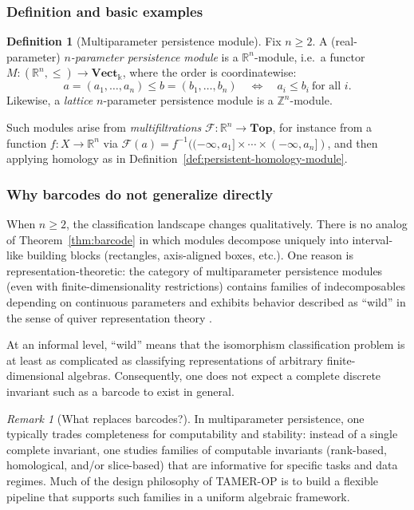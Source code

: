 \documentclass{article}
\newcommand{\kk}{\Bbbk}
\newcommand{\<}{\langle}
\renewcommand{\>}{\rangle}
\newcommand{\bbb}[1]{\ensuremath{\mathbb{#1}}}
\theoremstyle{definition}
\newtheorem{defn}[theorem]{Definition}
\theoremstyle{remark}
\newtheorem*{remark}{Remark}
\begin{document}
	\subsubsection*{Definition and basic examples}
	
	\begin{defn}[Multiparameter persistence module]\label{def:multi-parameter-module}
		Fix $n\geq 2$.  A (real-parameter) \emph{$n$-parameter persistence module} is a
		$\bbb{R}^n$-module, i.e.\ a functor $M\colon (\bbb{R}^n,\leq)\to\mathbf{Vect}_{\kk}$,
		where the order is coordinatewise:
		\[
		a=(a_1,\dots,a_n)\leq b=(b_1,\dots,b_n)\quad\Longleftrightarrow\quad
		a_i\leq b_i\ \text{for all }i.
		\]
		Likewise, a \emph{lattice} $n$-parameter persistence module is a $\bbb{Z}^n$-module.
	\end{defn}
	
	Such modules arise from \emph{multifiltrations} $\mathcal{F}\colon \bbb{R}^n\to
	\mathbf{Top}$, for instance from a function $f\colon X\to \bbb{R}^n$ via
	$\mathcal{F}(a)=f^{-1}((-\infty,a_1]\times\cdots\times(-\infty,a_n])$, and then
	applying homology as in Definition~\ref{def:persistent-homology-module}.
	
	\subsubsection*{Why barcodes do not generalize directly}
	
	When $n\geq 2$, the classification landscape changes qualitatively.  There is no
	analog of Theorem~\ref{thm:barcode} in which modules decompose uniquely into
	interval-like building blocks (rectangles, axis-aligned boxes, etc.).  One reason is
	representation-theoretic: the category of multiparameter persistence modules (even
	with finite-dimensionality restrictions) contains families of indecomposables
	depending on continuous parameters and exhibits behavior described as ``wild'' in
	the sense of quiver representation theory \cite{CZ09,Oud15}.
	
	At an informal level, ``wild'' means that the isomorphism classification problem is
	at least as complicated as classifying representations of arbitrary finite-dimensional
	algebras.  Consequently, one does not expect a complete discrete invariant such as a
	barcode to exist in general.
	
	\begin{remark}[What replaces barcodes?]\label{rmk:what-replaces-barcodes}
		In multiparameter persistence, one typically trades completeness for computability and
		stability: instead of a single complete invariant, one studies families of computable
		invariants (rank-based, homological, and/or slice-based) that are informative for
		specific tasks and data regimes.  Much of the design philosophy of TAMER-OP is to build
		a flexible pipeline that supports such families in a uniform algebraic framework.
	\end{remark}
	
\end{document}
